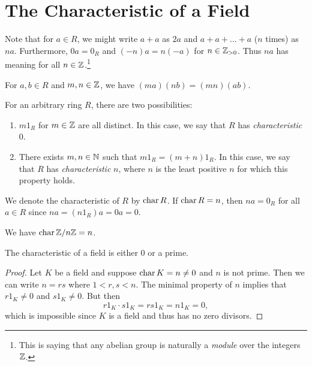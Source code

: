 \section{The Characteristic of a Field}
Note that for $a \in R$, we might write $a + a$ as
$2a$ and $a + a + \dots + a$ ($n$ times) as $na$.
Furthermore, $0a = 0_R$ and $(-n)a = n(-a)$ for
$n \in \mathbb{Z}_{> 0}$. Thus $na$ has meaning for all
$n \in \mathbb{Z}$.\footnote{This is saying that any abelian group is naturally a \emph{module} over the integers $\mathbb{Z}$.}

\begin{exercise}
  For $a, b \in R$ and $m, n \in \mathbb{Z}$, we have
  $(ma)(nb) = (mn)(ab)$.
\end{exercise}

\begin{definition}
For an arbitrary ring $R$, there are two possibilities:
\begin{enumerate}
  \item $m 1_R$ for $m \in \mathbb{Z}$ are all distinct. In
    this case, we say that $R$ has \emph{characteristic}
    $0$.
  \item There exists $m, n \in \mathbb{N}$ such that
    $m 1_R = (m + n) 1_R$. In this case, we say that
    $R$ has \emph{characteristic} $n$, where $n$ is
    the least positive $n$ for which this property
    holds.
\end{enumerate}
We denote the characteristic of $R$ by $\operatorname{char} R$.
If $\operatorname{char} R = n$, then $na = 0_R$ for all $a \in R$
since $na = (n 1_R) a = 0a = 0$.
\end{definition}

\begin{example}
  We have $\operatorname{char} \mathbb{Z} / n\mathbb{Z} = n$.
\end{example}

\begin{theorem}
  The characteristic of a field is either $0$ or a prime.
\end{theorem}

\begin{proof}
  Let $K$ be a field and suppose $\operatorname{char} K = n \ne 0$
  and $n$ is not prime. Then we can write $n = rs$ where
  $1 < r, s < n$. The minimal property of $n$
  implies that $r 1_K \ne 0$ and $s 1_K \ne 0$. But then
  \[
    r 1_K \cdot s 1_K = rs 1_K = n 1_K = 0,
  \]
  which is impossible since $K$ is a field and thus
  has no zero divisors.
\end{proof}

